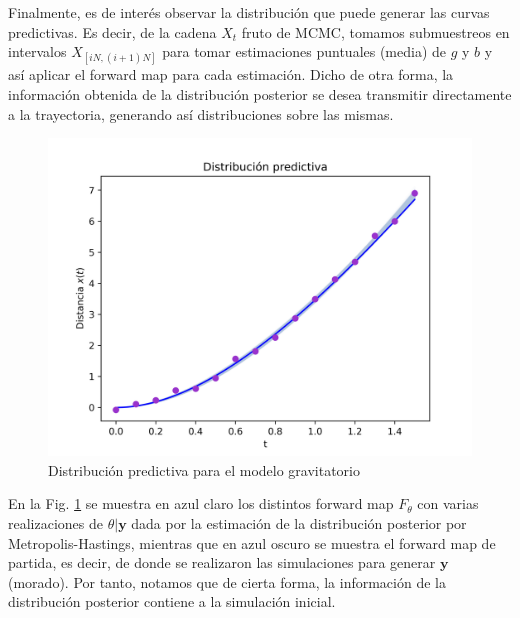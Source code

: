 
Finalmente, es de interés observar la distribución que puede generar las curvas predictivas. Es decir, de la cadena $X_t$ fruto de MCMC, tomamos submuestreos en intervalos $X_{[iN,(i+1)N]}$ para tomar estimaciones puntuales (media) de $g$ y $b$ y así aplicar el forward map para cada estimación. Dicho de otra forma, la información obtenida de la distribución posterior se desea transmitir directamente a la trayectoria, generando así distribuciones sobre las mismas.

\begin{figure}
    \centering 
    \includegraphics[width = 10 cm ]{img/Exp_Central_gravedad_sigma/Figuras/Generales/Predictiva_gravedad_sigma.png} 
    \caption{Distribución predictiva para el modelo gravitatorio}
    \label{Fig. 3.2.2.06}
\end{figure} 

En la Fig. \ref{Fig. 3.2.2.06} se muestra en azul claro los distintos forward map $F_{\theta}$ con varias realizaciones de $\theta|\mathbf{y}$ dada por la estimación de la distribución posterior por Metropolis-Hastings, mientras que en azul oscuro se muestra el forward map de partida, es decir, de donde se realizaron las simulaciones para generar $\mathbf{y}$ (morado). Por tanto, notamos que de cierta forma, la información de la distribución posterior contiene a la simulación inicial.

